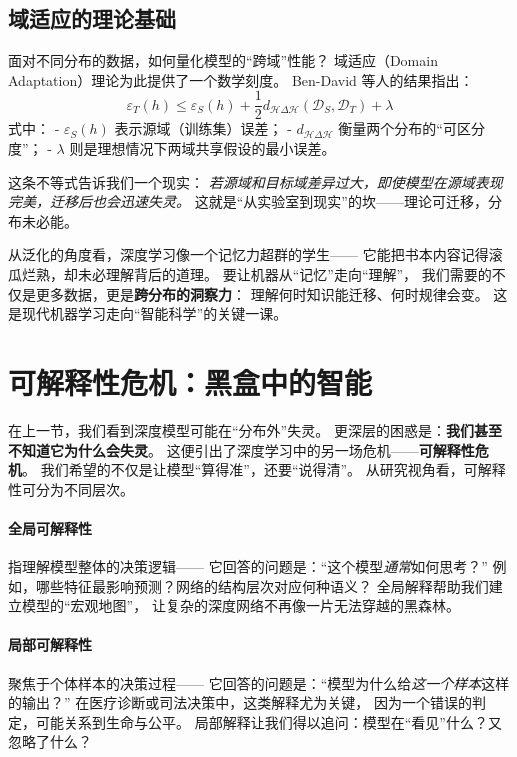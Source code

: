 \subsection{域适应的理论基础}

面对不同分布的数据，如何量化模型的“跨域”性能？  
域适应（Domain Adaptation）理论为此提供了一个数学刻度。  
Ben-David 等人的结果指出：  
$$\varepsilon_T(h) \leq \varepsilon_S(h) + \frac{1}{2}d_{\mathcal{H}\Delta\mathcal{H}}(\mathcal{D}_S, \mathcal{D}_T) + \lambda$$  
式中：  
- $\varepsilon_S(h)$ 表示源域（训练集）误差；  
- $d_{\mathcal{H}\Delta\mathcal{H}}$ 衡量两个分布的“可区分度”；  
- $\lambda$ 则是理想情况下两域共享假设的最小误差。  

这条不等式告诉我们一个现实：  
\textit{若源域和目标域差异过大，即使模型在源域表现完美，迁移后也会迅速失灵。}  
这就是“从实验室到现实”的坎——理论可迁移，分布未必能。

从泛化的角度看，深度学习像一个记忆力超群的学生——  
它能把书本内容记得滚瓜烂熟，却未必理解背后的道理。  
要让机器从“记忆”走向“理解”，  
我们需要的不仅是更多数据，更是\textbf{跨分布的洞察力}：  
理解何时知识能迁移、何时规律会变。  
这是现代机器学习走向“智能科学”的关键一课。

\section{可解释性危机：黑盒中的智能}

在上一节，我们看到深度模型可能在“分布外”失灵。  
更深层的困惑是：\textbf{我们甚至不知道它为什么会失灵}。  
这便引出了深度学习中的另一场危机——\textbf{可解释性危机}。  
我们希望的不仅是让模型“算得准”，还要“说得清”。  
从研究视角看，可解释性可分为不同层次。

\paragraph{全局可解释性}  
指理解模型整体的决策逻辑——  
它回答的问题是：“这个模型\textit{通常}如何思考？”  
例如，哪些特征最影响预测？网络的结构层次对应何种语义？  
全局解释帮助我们建立模型的“宏观地图”，  
让复杂的深度网络不再像一片无法穿越的黑森林。

\paragraph{局部可解释性}  
聚焦于个体样本的决策过程——  
它回答的问题是：“模型为什么给\textit{这一个样本}这样的输出？”  
在医疗诊断或司法决策中，这类解释尤为关键，  
因为一个错误的判定，可能关系到生命与公平。  
局部解释让我们得以追问：模型在“看见”什么？又忽略了什么？

